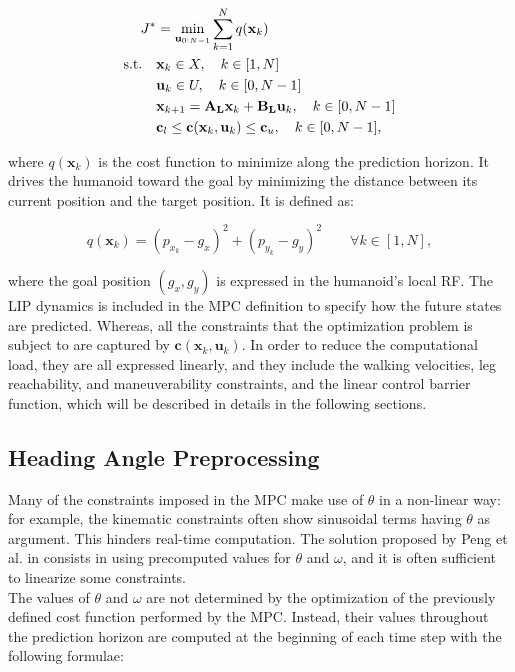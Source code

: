 \begin{align}
    J^* &= \min_{\mathbf{u}_{0:N-1}} \sum_{k=1}^{N} q(\mathbf{x}_k) \\
    \text{s.t.} \quad
    &\mathbf{x}_k \in X, \quad k \in [1, N] \notag \\
    &\mathbf{u}_k \in U, \quad k \in [0, N-1] \notag \\
    &\mathbf{x}_{k+1} = \mathbf{A_L} \mathbf{x}_k + \mathbf{B_L} \mathbf{u}_k, \quad k \in [0, N-1] \notag \\
    &\mathbf{c}_l \leq \mathbf{c}(\mathbf{x}_k, \mathbf{u}_k) \leq \mathbf{c}_u, \quad k \in [0, N-1], \notag
    \label{eq:lip-mpc}
\end{align}

where $q(\mathbf{x}_k)$ is the cost function to minimize along the prediction horizon. It drives the humanoid toward the goal by minimizing the distance between its current position and the target position. It is defined as:

$$
q(\mathbf{x}_k) = \left( p_{x_k} - g_x \right)^2 + \left( p_{y_k} - g_y \right)^2 \qquad \forall k \in \left[1, N\right],
$$

where the goal position $(g_x, g_y)$ is expressed in the humanoid's local RF. The LIP dynamics is included in the MPC definition to specify how the future states are predicted. Whereas, all the constraints that the optimization problem is subject to are captured by $\mathbf{c}(\mathbf{x}_k, \mathbf{u}_k)$. In order to reduce the computational load, they are all expressed linearly, and they include the walking velocities, leg reachability, and maneuverability constraints, and the linear control barrier function, which will be described in details in the following sections.

\subsection{Heading Angle Preprocessing}
Many of the constraints imposed in the MPC make use of $\theta$ in a non-linear way: for example, the kinematic constraints often show sinusoidal terms having $\theta$ as argument. This hinders real-time computation. The solution proposed by Peng et al. in \cite{peng_main_paper} consists in using precomputed values for $\theta$ and $\omega$, and it is often sufficient to linearize some constraints.\\
The values of $\theta$ and $\omega$ are not determined by the optimization of the previously defined cost function performed by the MPC. Instead, their values throughout the prediction horizon are computed at the beginning of each time step with the following formulae:

